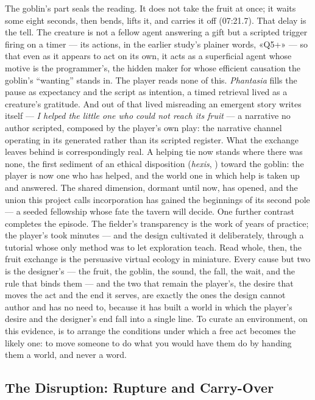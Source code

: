 The goblin's part seals the reading. It does not take the fruit at once; it waits some eight seconds, then bends, lifts it, and carries it off (07:21.7). That delay is the tell. The creature is not a fellow agent answering a gift but a scripted trigger firing on a timer — its actions, in the earlier study's plainer words, «Q5+» — so that even as it appears to act on its own, it acts as a superficial agent whose motive is the programmer's, the hidden maker for whose efficient causation the goblin's ``wanting'' stands in. The player reads none of this. \textit{Phantasia} fills the pause as expectancy and the script as intention, a timed retrieval lived as a creature's gratitude. And out of that lived misreading an emergent story writes itself — \textit{I helped the little one who could not reach its fruit} — a narrative no author scripted, composed by the player's own play: the narrative channel operating in its generated rather than its scripted register. What the exchange leaves behind is correspondingly real. A helping tie now stands where there was none, the first sediment of an ethical disposition (\textit{hexis}, ) toward the goblin: the player is now one who has helped, and the world one in which help is taken up and answered. The shared dimension, dormant until now, has opened, and the union this project calls incorporation has gained the beginnings of its second pole — a seeded fellowship whose fate the tavern will decide. One further contrast completes the episode. The fielder's transparency is the work of years of practice; the player's took minutes — and the design cultivated it deliberately, through a tutorial whose only method was to let exploration teach. Read whole, then, the fruit exchange is the persuasive virtual ecology in miniature. Every cause but two is the designer's — the fruit, the goblin, the sound, the fall, the wait, and the rule that binds them — and the two that remain the player's, the desire that moves the act and the end it serves, are exactly the ones the design cannot author and has no need to, because it has built a world in which the player's desire and the designer's end fall into a single line. To curate an environment, on this evidence, is to arrange the conditions under which a free act becomes the likely one: to move someone to do what you would have them do by handing them a world, and never a word.

\bigskip

\subsection*{The Disruption: Rupture and Carry-Over}

